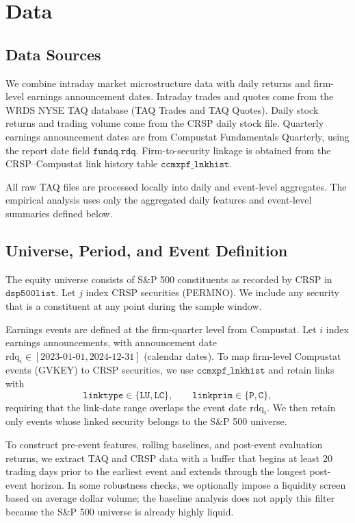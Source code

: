 \section{Data}

\subsection{Data Sources}

We combine intraday market microstructure data with daily returns and firm-level earnings announcement dates.
Intraday trades and quotes come from the WRDS NYSE TAQ database (TAQ Trades and TAQ Quotes).
Daily stock returns and trading volume come from the CRSP daily stock file.
Quarterly earnings announcement dates are from Compustat Fundamentals Quarterly, using the report date field $\texttt{fundq.rdq}$.
Firm-to-security linkage is obtained from the CRSP--Compustat link history table $\texttt{ccmxpf\_lnkhist}$.

All raw TAQ files are processed locally into daily and event-level aggregates.
The empirical analysis uses only the aggregated daily features and event-level summaries defined below.

\subsection{Universe, Period, and Event Definition}

The equity universe consists of S\&P 500 constituents as recorded by CRSP in $\texttt{dsp500list}$.
Let $j$ index CRSP securities (PERMNO). We include any security that is a constituent at any point during the sample window.

Earnings events are defined at the firm-quarter level from Compustat.
Let $i$ index earnings announcements, with announcement date $\mathrm{rdq}_i \in [\text{2023-01-01},\text{2024-12-31}]$ (calendar dates).
To map firm-level Compustat events (GVKEY) to CRSP securities, we use $\texttt{ccmxpf\_lnkhist}$ and retain links with
\[
\texttt{linktype} \in \{\texttt{LU},\texttt{LC}\},\qquad
\texttt{linkprim} \in \{\texttt{P},\texttt{C}\},
\]
requiring that the link-date range overlaps the event date $\mathrm{rdq}_i$.
We then retain only events whose linked security belongs to the S\&P 500 universe.

To construct pre-event features, rolling baselines, and post-event evaluation returns, we extract TAQ and CRSP data with a buffer that begins at least 20 trading days prior to the earliest event and extends through the longest post-event horizon.
In some robustness checks, we optionally impose a liquidity screen based on average dollar volume; the baseline analysis does not apply this filter because the S\&P 500 universe is already highly liquid.

